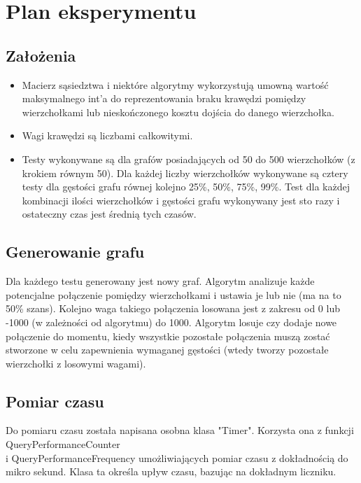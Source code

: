\documentclass{article}
\begin{document}
\section{Plan eksperymentu}
    \subsection{Założenia}
        \begin{itemize}
            \item Macierz sąsiedztwa i niektóre algorytmy wykorzystują umowną wartość maksymalnego int'a do reprezentowania 
            braku krawędzi pomiędzy wierzchołkami lub nieskończonego kosztu dojścia do danego wierzchołka.
            \item Wagi krawędzi są liczbami całkowitymi.
            \item Testy wykonywane są dla grafów posiadających od 50 do 500 wierzchołków (z krokiem równym 50). Dla każdej liczby wierzchołków
            wykonywane są cztery testy dla gęstości grafu równej kolejno 25\%, 50\%, 75\%, 99\%. Test dla każdej kombinacji ilości wierzchołków
            i gęstości grafu wykonywany jest sto razy i ostateczny czas jest średnią tych czasów.
        \end{itemize}

    \subsection{Generowanie grafu}
    Dla każdego testu generowany jest nowy graf. Algorytm analizuje każde potencjalne połączenie pomiędzy wierzchołkami i ustawia je lub nie (ma na to 50\% szans). 
    Kolejno waga takiego połączenia losowana jest z zakresu od 0 lub -1000 (w zależności od algorytmu) do 1000. Algorytm losuje czy dodaje nowe połączenie do momentu,
    kiedy wszystkie pozostałe połączenia muszą zostać stworzone w celu zapewnienia wymaganej gęstości (wtedy tworzy pozostałe wierzchołki z losowymi wagami).
    
    \subsection{Pomiar czasu}
    Do pomiaru czasu została napisana osobna klasa "Timer". Korzysta ona z funkcji QueryPerformanceCounter\\
    i QueryPerformanceFrequency umożliwiających pomiar czasu z dokładnością do mikro sekund. Klasa ta określa upływ czasu, bazując na dokładnym liczniku.
    
\end{document}
